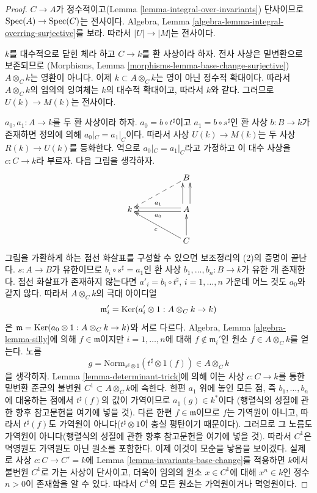 \begin{proof}
$C \to A$가 정수적이고(Lemma \ref{lemma-integral-over-invariants}) 단사이므로 $\mathop{\mathrm{Spec}}(A) \to \mathop{\mathrm{Spec}}(C)$는 전사이다.
Algebra, Lemma \ref{algebra-lemma-integral-overring-surjective}를 보라. 따라서 $|U| \to |M|$는 전사이다.

\medskip\noindent
$k$를 대수적으로 닫힌 체라 하고 $C \to k$를 환 사상이라 하자. 전사 사상은 밑변환으로 보존되므로
(Morphisms, Lemma \ref{morphisms-lemma-base-change-surjective}) $A \otimes_C k$는 영환이 아니다.
이제 $k \subset A \otimes_C k$는 영이 아닌 정수적 확대이다. 따라서 $A \otimes_C k$의 임의의 잉여체는
$k$의 대수적 확대이고, 따라서 $k$와 같다. 그러므로 $U(k) \to M(k)$는 전사이다.

\medskip\noindent
$a_0, a_1 : A \to k$를 두 환 사상이라 하자. $a_0 = b \circ t^\sharp$이고 $a_1 = b \circ s^\sharp$인
환 사상 $b : B \to k$가 존재하면 정의에 의해 $a_0|_C = a_1|_C$이다. 따라서 사상 $U(k) \to M(k)$는
두 사상 $R(k) \to U(k)$를 등화한다. 역으로 $a_0|_C = a_1|_C$라고 가정하고 이 대수 사상을
$c : C \to k$라 부르자. 다음 그림을 생각하자.
$$
\xymatrix{
& &
B \ar@{-->}[lld] \\
k & &
A
\ar@<0.5ex>[ll]^{a_0}
\ar@<-0.5ex>[ll]_{a_1}
\ar@<1ex>[u]
\ar@<-1ex>[u] \\
& &
C \ar[u] \ar[llu]^c
}
$$
그림을 가환하게 하는 점선 화살표를 구성할 수 있으면 보조정리의 (2)의 증명이 끝난다. $s : A \to B$가 유한이므로
$b_i \circ s^\sharp = a_1$인 환 사상 $b_1, \ldots, b_n : B \to k$가 유한 개 존재한다.
점선 화살표가 존재하지 않는다면 $a'_i = b_i \circ t^\sharp$, $i = 1, \ldots, n$ 가운데 어느 것도 $a_0$와 같지 않다.
따라서 $A \otimes_C k$의 극대 아이디얼
$$
\mathfrak m'_i = \mathop{\mathrm{Ker}}(a_i' \otimes 1 : A \otimes_C k \to k)
$$
은 $\mathfrak m = \mathop{\mathrm{Ker}}(a_0 \otimes 1 : A \otimes_C k \to k)$와 서로 다르다.
Algebra, Lemma \ref{algebra-lemma-silly}에 의해 $f \in \mathfrak m$이지만
$i = 1, \ldots, n$에 대해 $f \not \in \mathfrak m_i'$인 원소 $f \in A \otimes_C k$를 얻는다. 노름
$$
g = \text{Norm}_{s^\sharp \otimes 1}(t^\sharp \otimes 1(f))
\in
A \otimes_C k
$$
을 생각하자. Lemma \ref{lemma-determinant-trick}에 의해 이는 사상 $c : C \to k$를 통한 밑변환 준군의
불변원 $C^1 \subset A \otimes_C k$에 속한다. 한편 $a_1$ 위에 놓인 모든 점, 즉
$b_1, \ldots, b_n$에 대응하는 점에서 $t^\sharp(f)$의 값이 가역이므로 $a_1(g) \in k^*$이다
(행렬식의 성질에 관한 향후 참고문헌을 여기에 넣을 것). 다른 한편 $f \in \mathfrak m$이므로 $f$는 가역원이 아니고,
따라서 $t^\sharp(f)$도 가역원이 아니다($t^\sharp \otimes 1$이 충실 평탄이기 때문이다). 그러므로 그 노름도
가역원이 아니다(행렬식의 성질에 관한 향후 참고문헌을 여기에 넣을 것). 따라서 $C^1$은 멱영원도 가역원도 아닌
원소를 포함한다. 이제 이것이 모순을 낳음을 보이겠다. 실제로 사상 $c : C \to C' = k$에
Lemma \ref{lemma-invariants-base-change}를 적용하면 $k$에서 불변원 $C^1$로 가는 사상이 단사이고,
더욱이 임의의 원소 $x \in C^1$에 대해 $x^n \in k$인 정수 $n > 0$이 존재함을 알 수 있다.
따라서 $C^1$의 모든 원소는 가역원이거나 멱영원이다.


\end{proof}
